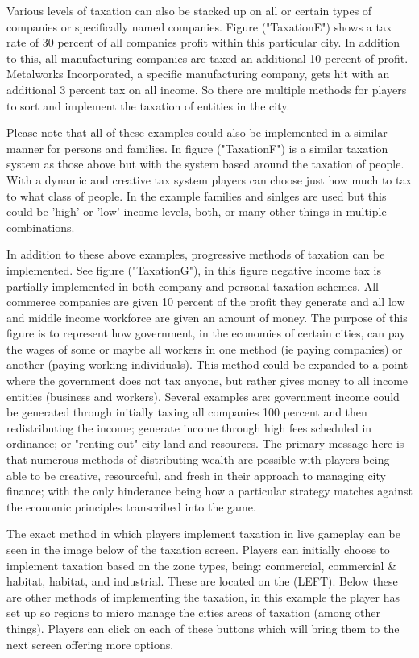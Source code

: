 Various levels of taxation can also be stacked up on all or certain types of companies or specifically named companies.
Figure ("TaxationE") shows a tax rate of 30 percent of all companies profit within this particular city. In addition to this, all manufacturing companies are taxed an additional 10 percent of profit. Metalworks Incorporated, a specific manufacturing company, gets hit with an additional 3 percent tax on all income. So there are multiple methods for players to sort and implement the taxation of entities in the city.

Please note that all of these examples could also be implemented in a similar manner for persons and families. In figure ("TaxationF") is a similar taxation system as those above but with the system based around the taxation of people. With a dynamic and creative tax system players can choose just how much to tax to what class of people. In the example families and sinlges are used but this could be 'high' or 'low' income levels, both, or many other things in multiple combinations.

In addition to these above examples, progressive methods of taxation can be implemented. See figure ("TaxationG"), in this figure negative income tax is partially implemented in both company and personal taxation schemes. All commerce companies are given 10 percent of the profit they generate and all low and middle income workforce are given an amount of money. The purpose of this figure is to represent how government, in the economies of certain cities, can pay the wages of some or maybe all workers in one method (ie paying companies) or another (paying working individuals). This method could be expanded to a point where the government does not tax anyone, but rather gives money to all income entities (business and workers). Several examples are: government income could be generated through initially taxing all companies 100 percent and then redistributing the income; generate income through high fees scheduled in ordinance; or "renting out" city land and resources. The primary message here is that numerous methods of distributing wealth are possible with players being able to be creative, resourceful, and fresh in their approach to managing city finance; with the only hinderance being how a particular strategy matches against the economic principles transcribed into the game.  


The exact method in which players implement taxation in live gameplay can be seen in the image below of the taxation screen.
Players can initially choose to implement taxation based on the zone types, being: commercial, commercial &  habitat, habitat, and industrial. These are located on the (LEFT). Below these are other methods of implementing the taxation, in this example the player has set up so regions to micro manage the cities areas of taxation (among other things). Players can click on each of these buttons which will bring them to the next screen offering more options. 

